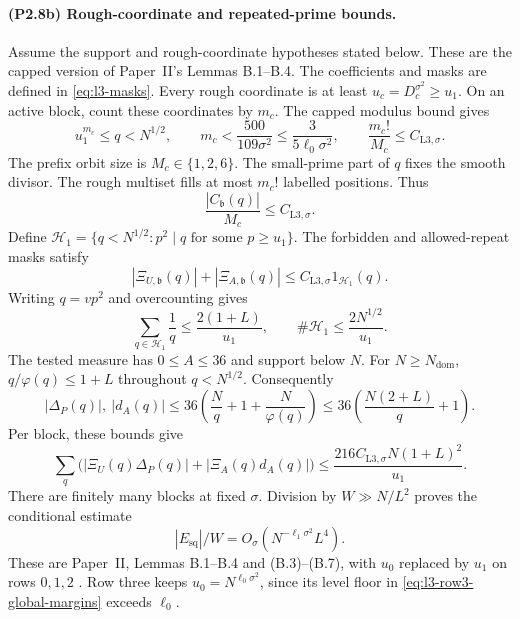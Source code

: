 \paragraph{(P2.8b) Rough-coordinate and repeated-prime bounds.}
Assume the support and rough-coordinate hypotheses stated below.
These are the capped version of Paper~II's Lemmas B.1--B.4.
The coefficients and masks are defined in \eqref{eq:l3-masks}.
Every rough coordinate is at least $u_c=D_c^{\sigma^2}\ge u_1$.
On an active block, count these coordinates by $m_c$.
The capped modulus bound gives
\begin{equation}\label{eq:l3-rough-count}
 u_1^{m_c}\le q<N^{1/2},\qquad
 m_c<\frac{500}{109\sigma^2}
       \le\frac3{5\ell_0\sigma^2},\qquad
 \frac{m_c!}{M_c}\le C_{\mathrm{L3},\sigma}.
\end{equation}
The prefix orbit size is $M_c\in\{1,2,6\}$.
The small-prime part of $q$ fixes the smooth divisor.
The rough multiset fills at most $m_c!$ labelled positions.
Thus
\begin{equation}\label{eq:l3-cap-coefficient-bound}
 \frac{|C_{\mathfrak b}(q)|}{M_c}\le C_{\mathrm{L3},\sigma}.
\end{equation}
Define $\mathcal H_1=\{q<N^{1/2}:p^2\mid q\text{ for some }p\ge u_1\}$.
The forbidden and allowed-repeat masks satisfy
\begin{equation}\label{eq:l3-u1-masks}
 |\Xi_{U,\mathfrak b}(q)|+|\Xi_{A,\mathfrak b}(q)|
                \le C_{\mathrm{L3},\sigma}1_{\mathcal H_1}(q).
\end{equation}
Writing $q=vp^2$ and overcounting gives
\begin{equation}\label{eq:l3-u1-sums}
 \sum_{q\in\mathcal H_1}\frac1q\le\frac{2(1+L)}{u_1},
 \qquad \#\mathcal H_1\le\frac{2N^{1/2}}{u_1}.
\end{equation}
The tested measure has $0\le A\le36$ and support below $N$.
For $N\ge N_{\mathrm{dom}}$, $q/\varphi(q)\le1+L$ throughout $q<N^{1/2}$.
Consequently
\begin{equation}\label{eq:l3-u1-test}
 |\Delta_P(q)|,\ |d_A(q)|
 \le36\left(\frac Nq+1+\frac N{\varphi(q)}\right)
 \le36\left(\frac{N(2+L)}q+1\right).
\end{equation}
Per block, these bounds give
\begin{equation}\label{eq:l3-u1-block}
 \sum_q\bigl(|\Xi_U(q)\Delta_P(q)|+|\Xi_A(q)d_A(q)|\bigr)
       \le\frac{216C_{\mathrm{L3},\sigma} N(1+L)^2}{u_1}.
\end{equation}
There are finitely many blocks at fixed $\sigma$.
Division by $W\gg N/L^2$ proves the conditional estimate
\begin{equation}\label{eq:l3-repeated-cap}
 |E_{\mathrm{sq}}|/W=O_\sigma(N^{-\ell_1\sigma^2}L^4).
\end{equation}
These are Paper~II, Lemmas B.1--B.4 and (B.3)--(B.7),
with $u_0$ replaced by $u_1$ on rows $0,1,2$
\cite[Appendix~B.1, Lemmas B.1--B.4, (B.3)--(B.7)]{PaperII}.
Row three keeps $u_0=N^{\ell_0\sigma^2}$, since its level floor
in \eqref{eq:l3-row3-global-margins} exceeds $\ell_0$.
